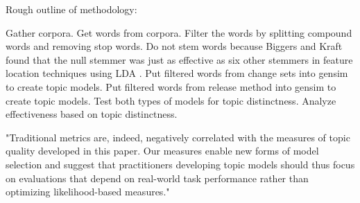 
Rough outline of methodology:

Gather corpora.
Get words from corpora.
Filter the words by splitting compound words and removing stop words.
Do not stem words because Biggers and Kraft found that the null stemmer was just as effective as six other stemmers in feature location techniques using LDA \cite{Biggers-Kraft}.
Put filtered words from change sets into gensim to create topic models.
Put filtered words from release method into gensim to create topic models.
Test both types of models for topic distinctness.
Analyze effectiveness based on topic distinctness.


"Traditional metrics are, indeed, negatively correlated with the
measures of topic quality developed in this paper.  Our measures enable
new forms of model selection and suggest that practitioners developing
topic models should thus focus on evaluations that depend on real-world
task performance rather than optimizing likelihood-based measures."  \cite{Chang2009}
